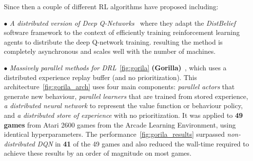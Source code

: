 \clearpage

Since then a couple of different RL algorithms have proposed including:

$\bullet$ \textit{A distributed version of Deep Q-Networks}~\parencite{ong2015distributed} where they adapt the \textit{DistBelief} software framework to the context of efficiently
training reinforcement learning agents to distribute the deep Q-network training. resulting the method is completely asynchronous and scales well with the number of machines. 

$\bullet$ \textit{Massively parallel methods for DRL}~\ref{fig:gorila} \textbf{(Gorilla)}~\parencite{nair2015massively}, which uses a distributed experience replay buffer (and no prioritization). This architecture~\ref{fig:gorila_arch} uses four main components: \textit{parallel actors} that generate new behaviour, \textit{parallel learners} that are trained from stored experience, \textit{a distributed neural network} to represent the value function or behaviour policy, and \textit{a distributed store of experience} with no prioritization. It was applied to \textbf{49 games} from Atari 2600 games from the Arcade Learning Environment, using identical hyperparameters. The performance~\ref{fig:gorila_results} surpassed \textit{non-distributed DQN} in \textbf{41} of the 49 games and also reduced the wall-time required to achieve these results by an order of magnitude on most games.

